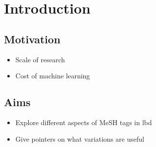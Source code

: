 \documentclass{l4proj}
\begin{document}
%
%
%
%
%
%
%
%
\chapter{Introduction}


\section{Motivation}
\begin{itemize}
    \item Scale of research
    \item Cost of machine learning
\end{itemize}

\section{Aims}
\begin{itemize}
    \item Explore different aspects of MeSH tags in lbd
    \item Give pointers on what variations are useful
\end{itemize}
\end{document}
